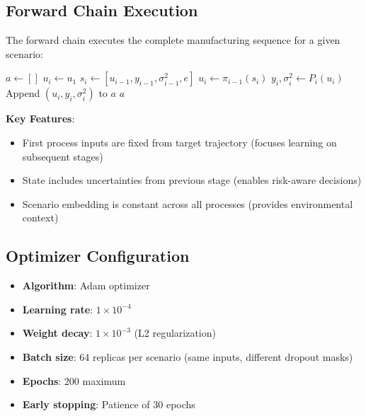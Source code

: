 \documentclass[11pt,a4paper]{article}
\begin{document}
\subsection{Forward Chain Execution}

The forward chain executes the complete manufacturing sequence for a given scenario:

\begin{algorithm}
\caption{ForwardChain($\pi$, $P$, $u_1$, $e$)}
\begin{algorithmic}[1]
\State $a \gets []$ 
        \State $u_i \gets u_1$ 
    \Else
        \State $s_i \gets [u_{i-1}, y_{i-1}, \sigma^2_{i-1}, e]$ 
        \State $u_i \gets \pi_{i-1}(s_i)$ 
    \EndIf
    \State $y_i, \sigma^2_i \gets P_i(u_i)$ 
    \State Append $(u_i, y_i, \sigma^2_i)$ to $a$
\EndFor
\State \Return $a$
\end{algorithmic}
\end{algorithm}

\textbf{Key Features}:
\begin{itemize}
    \item First process inputs are fixed from target trajectory (focuses learning on subsequent stages)
    \item State includes uncertainties from previous stage (enables risk-aware decisions)
    \item Scenario embedding is constant across all processes (provides environmental context)
\end{itemize}

\subsection{Optimizer Configuration}

\begin{itemize}
    \item \textbf{Algorithm}: Adam optimizer
    \item \textbf{Learning rate}: $1 \times 10^{-4}$
    \item \textbf{Weight decay}: $1 \times 10^{-3}$ (L2 regularization)
    \item \textbf{Batch size}: 64 replicas per scenario (same inputs, different dropout masks)
    \item \textbf{Epochs}: 200 maximum
    \item \textbf{Early stopping}: Patience of 30 epochs
\end{itemize}
\end{document}
